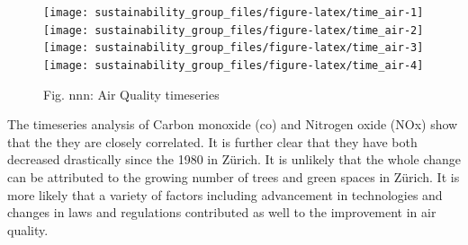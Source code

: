 \documentclass[
]{article}
\newenvironment{Shaded}{\begin{snugshade}}{\end{snugshade}}
\newcommand{\AttributeTok}[1]{\textcolor[rgb]{0.77,0.63,0.00}{#1}}
\newcommand{\CommentTok}[1]{\textcolor[rgb]{0.56,0.35,0.01}{\textit{#1}}}
\newcommand{\DecValTok}[1]{\textcolor[rgb]{0.00,0.00,0.81}{#1}}
\newcommand{\FunctionTok}[1]{\textcolor[rgb]{0.00,0.00,0.00}{#1}}
\newcommand{\NormalTok}[1]{#1}
\newcommand{\OtherTok}[1]{\textcolor[rgb]{0.56,0.35,0.01}{#1}}
\newcommand{\SpecialCharTok}[1]{\textcolor[rgb]{0.00,0.00,0.00}{#1}}
\newcommand{\StringTok}[1]{\textcolor[rgb]{0.31,0.60,0.02}{#1}}
\begin{document}
\begin{Shaded}
\end{Shaded}

\begin{figure}
\texttt{[image: sustainability\_group\_files/figure-latex/time\_air-1]} \texttt{[image: sustainability\_group\_files/figure-latex/time\_air-2]} \texttt{[image: sustainability\_group\_files/figure-latex/time\_air-3]} \texttt{[image: sustainability\_group\_files/figure-latex/time\_air-4]} \caption{Fig. nnn: Air Quality timeseries}\label{fig:time_air}
\end{figure}

The timeseries analysis of Carbon monoxide (co) and Nitrogen oxide (NOx)
show that the they are closely correlated. It is further clear that they
have both decreased drastically since the 1980 in Zürich. It is unlikely
that the whole change can be attributed to the growing number of trees
and green spaces in Zürich. It is more likely that a variety of factors
including advancement in technologies and changes in laws and
regulations contributed as well to the improvement in air quality.
\end{document}

